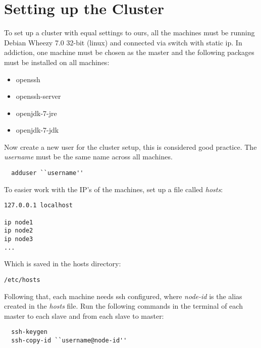 \section{Setting up the Cluster}
\label{sec:hadoop}
To set up a cluster with equal settings to ours, all the machines must be running Debian Wheezy 7.0 32-bit (linux) and connected via switch with static ip. In addiction, one machine must be chosen as the master and the following packages must be installed on all machines:
\begin{itemize}
\item openssh 
\item openssh-server 
\item openjdk-7-jre 
\item openjdk-7-jdk 
\end{itemize}
Now create a new user for the cluster setup, this is considered good practice. The \emph{username} must be the same name across all machines.
\lstset{language=bash}
\begin{lstlisting}
  adduser ``username''
\end{lstlisting} %
To easier work with the IP's of the machines, set up a file called \emph{hosts}:
\begin{verbatim}
127.0.0.1 localhost

ip node1
ip node2
ip node3
...
\end{verbatim}
Which is saved in the hosts directory: 
\begin{verbatim}
/etc/hosts
\end{verbatim}
Following that, each machine needs ssh configured, where \emph{node-id} is the alias created in the \emph{hosts} file. Run the following commands in the terminal of each master to each slave and from each slave to master:
\begin{lstlisting}
  ssh-keygen
  ssh-copy-id ``username@node-id''
\end{lstlisting}

